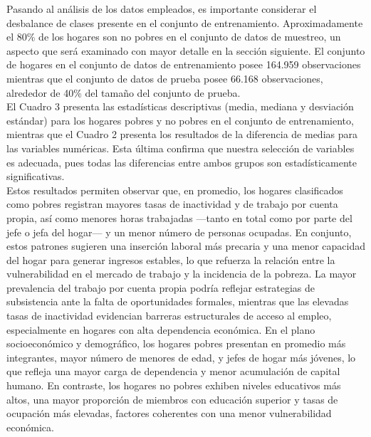 \documentclass[12pt,a4paper,onecolumn]{article}
\begin{document}
Pasando al análisis de los datos empleados, es importante considerar el desbalance de clases presente en el conjunto de entrenamiento. Aproximadamente el 80\% de los hogares son no pobres en el conjunto de datos de muestreo, un aspecto que será examinado con mayor detalle en la sección siguiente. El conjunto de hogares en el conjunto de datos de entrenamiento posee 164.959 observaciones mientras que el conjunto de datos de prueba posee 66.168 observaciones, alrededor de 40\% del tamaño del conjunto de prueba.\\

El Cuadro 3 presenta las estadísticas descriptivas (media, mediana y desviación estándar) para los hogares pobres y no pobres en el conjunto de entrenamiento, mientras que el Cuadro 2 presenta los resultados de la diferencia de medias para las variables numéricas. Esta última confirma que nuestra selección de variables es adecuada, pues todas las diferencias entre ambos grupos son estadísticamente significativas. \\

Estos resultados permiten observar que, en promedio, los hogares clasificados como pobres registran mayores tasas de inactividad y de trabajo por cuenta propia, así como menores horas trabajadas —tanto en total como por parte del jefe o jefa del hogar— y un menor número de personas ocupadas. En conjunto, estos patrones sugieren una inserción laboral más precaria y una menor capacidad del hogar para generar ingresos estables, lo que refuerza la relación entre la vulnerabilidad en el mercado de trabajo y la incidencia de la pobreza. La mayor prevalencia del trabajo por cuenta propia podría reflejar estrategias de subsistencia ante la falta de oportunidades formales, mientras que las elevadas tasas de inactividad evidencian barreras estructurales de acceso al empleo, especialmente en hogares con alta dependencia económica. En el plano socioeconómico y demográfico, los hogares pobres presentan en promedio más integrantes, mayor número de menores de edad, y jefes de hogar más jóvenes, lo que refleja una mayor carga de dependencia y menor acumulación de capital humano. En contraste, los hogares no pobres exhiben niveles educativos más altos, una mayor proporción de miembros con educación superior y tasas de ocupación más elevadas, factores coherentes con una menor vulnerabilidad económica.\\
\end{document}
